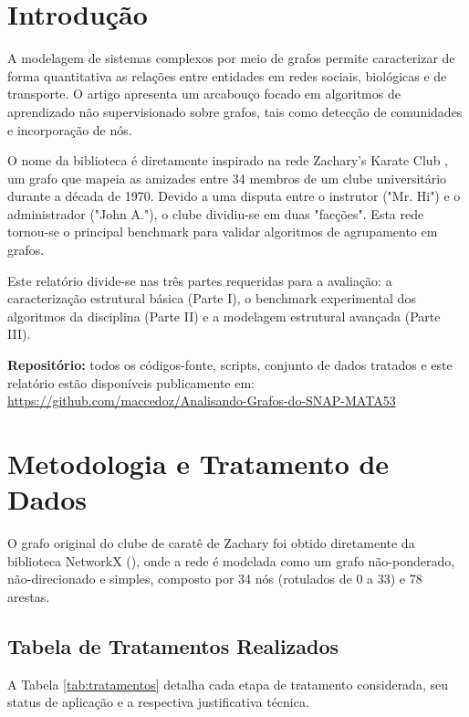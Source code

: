 \documentclass[sigconf]{webmedia}
\begin{document}
\section{Introdução}

A modelagem de sistemas complexos por meio de grafos permite caracterizar de forma quantitativa as relações entre entidades em redes sociais, biológicas e de transporte. O artigo \cite{Rozemberczki2020} apresenta um arcabouço focado em algoritmos de aprendizado não supervisionado sobre grafos, tais como detecção de comunidades e incorporação de nós. 

O nome da biblioteca é diretamente inspirado na rede  {Zachary's Karate Club} \cite{Zachary1977}, um grafo que mapeia as amizades entre 34 membros de um clube universitário durante a década de 1970. Devido a uma disputa entre o instrutor ("Mr. Hi") e o administrador ("John A."), o clube dividiu-se em duas "facções". Esta rede tornou-se o principal  {benchmark} para validar algoritmos de agrupamento em grafos.

Este relatório divide-se nas três partes requeridas para a avaliação: a caracterização estrutural básica (Parte I), o benchmark experimental dos algoritmos da disciplina (Parte II) e a modelagem estrutural avançada (Parte III).

\medskip
\noindent\textbf{Repositório:} todos os códigos-fonte, scripts, conjunto de dados tratados e este relatório estão disponíveis publicamente em: \url{https://github.com/maccedoz/Analisando-Grafos-do-SNAP-MATA53}

\section{Metodologia e Tratamento de Dados}

O grafo original do clube de caratê de Zachary foi obtido diretamente da biblioteca NetworkX (), onde a rede é modelada como um grafo não-ponderado, não-direcionado e simples, composto por 34 nós (rotulados de 0 a 33) e 78 arestas.

\subsection{Tabela de Tratamentos Realizados}

A Tabela \ref{tab:tratamentos} detalha cada etapa de tratamento considerada, seu status de aplicação e a respectiva justificativa técnica.
\end{document}
